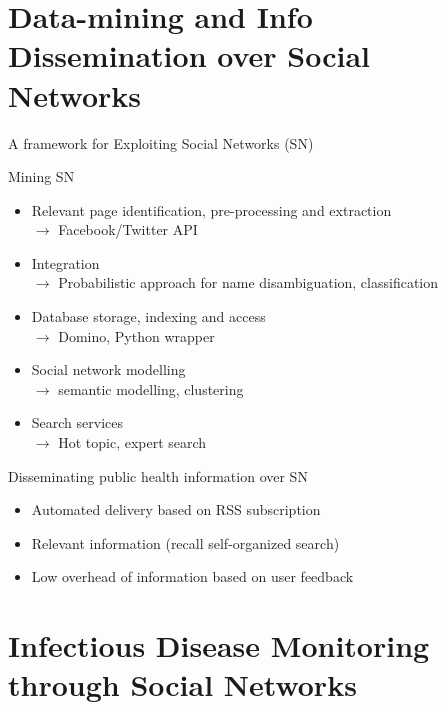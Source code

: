 \documentclass{beamer}
\begin{document}
\section{Data-mining and Info Dissemination over Social Networks}
\begin{frame}[t]{A framework for Exploiting Social Networks (SN)}	
\begin{block}{Mining SN}
\begin{itemize}
\item  \small Relevant page \alert{identification, pre-processing and extraction}\\
$\rightarrow$  \scriptsize Facebook/Twitter API
\item  \small \alert{Integration}\\ 
$\rightarrow$  \scriptsize  Probabilistic approach for name disambiguation, classification
\item  \small Database \alert{storage,  indexing and access}\\
$\rightarrow$  \scriptsize Domino, Python wrapper
\item \small Social network \alert{modelling}\\ 
$\rightarrow$  \scriptsize semantic modelling, clustering
\item \small \alert{Search} services\\
$\rightarrow$ \scriptsize Hot topic, expert search 
\end{itemize}
\end{block}
  	
\begin{block}{Disseminating public health information over SN}
\begin{itemize}
\item \small \alert{Automated delivery} based on RSS subscription
\item \small \alert{Relevant} information (recall self-organized search)
\item \small \alert{Low overhead} of information based on user feedback
\end{itemize}
\end{block}
  	
\end{frame}

\section{Infectious Disease Monitoring through  Social Networks}
\end{document}
